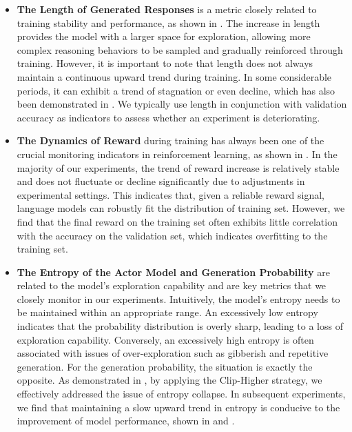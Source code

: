 \begin{itemize}
\item 
\textbf{The Length of Generated Responses} is a metric closely related to training stability and performance, as shown in . The increase in length provides the model with a larger space for exploration, allowing more complex reasoning behaviors to be sampled and gradually reinforced through training. However, it is important to note that length does not always maintain a continuous upward trend during training. In some considerable periods, it can exhibit a trend of stagnation or even decline, which has also been demonstrated in \cite{guo2025deepseek}. We typically use length in conjunction with validation accuracy as indicators to assess whether an experiment is deteriorating.

\item \textbf{The Dynamics of Reward} during training has always been one of the crucial monitoring indicators in reinforcement learning, as shown in . In the majority of our experiments, the trend of reward increase is relatively stable and does not fluctuate or decline significantly due to adjustments in experimental settings. This indicates that, given a reliable reward signal, language models can robustly fit the distribution of training set. However, we find that the final reward on the training set often exhibits little correlation with the accuracy on the validation set, which indicates overfitting to the training set.

\item \textbf{The Entropy of the Actor Model and Generation Probability} are related to the model's exploration capability and are key metrics that we closely monitor in our experiments. Intuitively, the model's entropy needs to be maintained within an appropriate range. An excessively low entropy indicates that the probability distribution is overly sharp, leading to a loss of exploration capability. Conversely, an excessively high entropy is often associated with issues of over-exploration such as gibberish and repetitive generation. For the generation probability, the situation is exactly the opposite. As demonstrated in , by applying the Clip-Higher strategy, we effectively addressed the issue of entropy collapse. In subsequent experiments, we find that maintaining a slow upward trend in entropy is conducive to the improvement of model performance, shown in  and .
\end{itemize}

